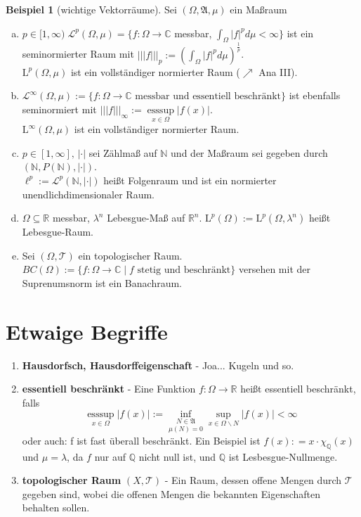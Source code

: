 \documentclass[ngerman]{report}
\theoremstyle{definition}%
\newtheorem{bsp}[section]{Beispiel}
\newcommand{\C}{\mathbb{C}}
\newcommand{\R}{\mathbb{R}}
\newcommand{\Q}{\mathbb{Q}}
\newcommand{\N}{\mathbb{N}}
\newcommand{\hA}{\mathfrak{A}}
\newcommand{\hL}{\mathcal{L}}
\newcommand{\tT}{\mathcal{T}} %
\newcommand{\nL}{\text{L}}
\newcommand{\ess}{\text{ess}}
\newcommand{\seminorm}[1]{||| #1 |||}
\begin{document}
\begin{bsp}[wichtige Vektorräume]
	Sei $(\Omega,\hA,\mu)$ ein Maßraum
		\begin{enumerate}[(a)]
			\item $p\in[1,\infty)\; \hL^p(\Omega,\mu) = \{f:\Omega \rightarrow \C$ messbar, 
						$\int_\Omega |f|^p d\mu < \infty \}$ ist ein seminormierter Raum mit 
						$\seminorm{f}_p := (\int_\Omega |f|^p d\mu )^{\frac{1}{p}}$.\\
						$\text{L}^p(\Omega,\mu)$ ist ein vollständiger normierter Raum ($\nearrow$ Ana III).

			\item $\hL^\infty(\Omega,\mu) := \{f:\Omega \rightarrow \C 
						\text{ messbar und essentiell beschränkt} \}$ ist ebenfalls seminormiert mit 
						$\seminorm{f}_\infty := \underset{x\in\Omega}{\ess \sup} |f(x)|$.\\
						$\text{L}^\infty(\Omega,\mu)$ ist ein vollständiger normierter Raum.

			\item $p\in [1,\infty],\, |\cdot|$ sei Zählmaß auf $\N$ und der Maßraum sei gegeben durch 
						$(\N, P(\N), |\cdot|)$.\\
						$\ell^p := \hL^p(\N, |\cdot|)$ heißt Folgenraum und ist ein normierter unendlichdimensionaler Raum.

			\item $\Omega \subseteq \R$ messbar, $\lambda^n$ Lebesgue-Maß auf $\R^n$.
						$\nL^p(\Omega) := \nL^p(\Omega,\lambda^n)$ heißt Lebesgue-Raum.

			\item Sei $(\Omega, \tT)$ ein topologischer Raum. 
						$BC(\Omega) := \{ f: \Omega \rightarrow \C\;|\;f 
						\text{ stetig und beschränkt} \}$ versehen mit der Suprenumsnorm ist ein Banachraum.
	\end{enumerate}

\end{bsp}


\section*{Etwaige Begriffe}
	\begin{enumerate}
		\item \textbf{Hausdorfsch, Hausdorffeigenschaft} -  Joa... Kugeln und so.

		\item \textbf{essentiell beschränkt} - 
					Eine Funktion $f: \Omega \rightarrow \R$ heißt essentiell beschränkt, falls 
					$$\underset{x\in\Omega}{\ess \sup} |f(x)| := \underset{{\mu(N) = 0}}{ \inf_{N \in \hA} }  
					\sup_{x\in \Omega\backslash N} |f(x)| < \infty$$
					oder auch: f ist fast überall beschränkt. 
					Ein Beispiel ist $f(x) : = x\cdot \chi_\Q(x)$ und $\mu = \lambda$, da $f$ nur auf $\Q$ nicht null ist, und $\Q$ ist Lesbesgue-Nullmenge. 

		\item \textbf{topologischer Raum} $(X,\tT)$ - Ein Raum, dessen offene Mengen durch $\tT$ gegeben sind, wobei die offenen Mengen die bekannten Eigenschaften behalten sollen.
	\end{enumerate} 
\end{document}
